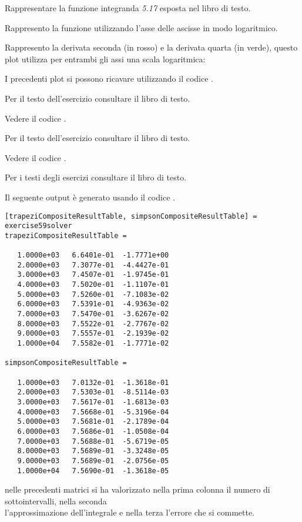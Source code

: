 \begin{exercise}
Rappresentare la funzione integranda \emph{5.17} esposta nel libro
di testo.
\end{exercise}
Rappresento la funzione utilizzando l'asse delle ascisse in modo logaritmico.
\begin{center}   

\end{center}
Rappresento la derivata seconda (in rosso) e la derivata quarta (in verde),
questo plot utilizza per entrambi gli assi una scala logaritmica:
\begin{center}   

\end{center} 
I precedenti plot si possono ricavare utilizzando il codice
.

\begin{exercise}[5.4] 
Per il testo dell'esercizio consultare il libro di testo.
\end{exercise}
Vedere il codice .

\begin{exercise}[5.5] 
Per il testo dell'esercizio consultare il libro di testo.
\end{exercise}
Vedere il codice .

\begin{exercise} 
Per i testi degli esercizi consultare il libro di testo.
\end{exercise}
Il seguente output \`e generato usando il codice
.
\begin{lstlisting}
[trapeziCompositeResultTable, simpsonCompositeResultTable] = exercise59solver
trapeziCompositeResultTable =

   1.0000e+03   6.6401e-01  -1.7771e+00
   2.0000e+03   7.3077e-01  -4.4427e-01
   3.0000e+03   7.4507e-01  -1.9745e-01
   4.0000e+03   7.5020e-01  -1.1107e-01
   5.0000e+03   7.5260e-01  -7.1083e-02
   6.0000e+03   7.5391e-01  -4.9363e-02
   7.0000e+03   7.5470e-01  -3.6267e-02
   8.0000e+03   7.5522e-01  -2.7767e-02
   9.0000e+03   7.5557e-01  -2.1939e-02
   1.0000e+04   7.5582e-01  -1.7771e-02

simpsonCompositeResultTable =

   1.0000e+03   7.0132e-01  -1.3618e-01
   2.0000e+03   7.5303e-01  -8.5114e-03
   3.0000e+03   7.5617e-01  -1.6813e-03
   4.0000e+03   7.5668e-01  -5.3196e-04
   5.0000e+03   7.5681e-01  -2.1789e-04
   6.0000e+03   7.5686e-01  -1.0508e-04
   7.0000e+03   7.5688e-01  -5.6719e-05
   8.0000e+03   7.5689e-01  -3.3248e-05
   9.0000e+03   7.5689e-01  -2.0756e-05
   1.0000e+04   7.5690e-01  -1.3618e-05
\end{lstlisting}
nelle precedenti matrici si ha valorizzato nella prima colonna il numero di
sottointervalli, nella seconda \\
l'approssimazione dell'integrale e nella terza l'errore che si commette.
